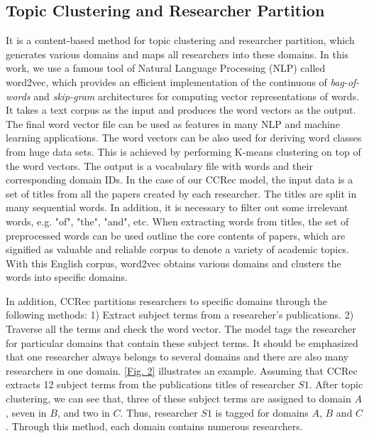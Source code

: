 \documentclass[10pt]{article}
\begin{document}
\subsection*{Topic Clustering and Researcher Partition}
It is a content-based method for topic clustering and researcher partition, which generates various domains and maps all researchers into these domains. In this work, we use a famous tool of Natural Language Processing (NLP) called word2vec, which provides an efficient implementation of the continuous of \emph{bag-of-words} and \emph{skip-gram} architectures for computing vector representations of words. It takes a text corpus as the input and produces the word vectors as the output. The final word vector file can be used as features in many NLP and machine learning applications. The word vectors can be also used for deriving word classes from huge data sets. This is achieved by performing K-means clustering on top of the word vectors. The output is a vocabulary file with words and their corresponding domain IDs. In the case of our CCRec model, the input data is a set of titles from all the papers created by each researcher. The titles are split in many sequential words. In addition, it is necessary to filter out some irrelevant words, e.g. "of", "the", "and", etc. When extracting words from titles, the set of preprocessed words can be used outline the core contents of papers, which are signified as valuable and reliable corpus to denote a variety of academic topics. With this English corpus, word2vec obtains various domains and clusters the words into specific domains.

In addition, CCRec partitions researchers to specific domains through the following methods: 1) Extract subject terms from a researcher's publications. 2) Traverse all the terms and check the word vector. The model tags the researcher for particular domains that contain these subject terms. It should be emphasized that one researcher always belongs to several domains and there are also many researchers in one domain. \autoref{Fig. 2} illustrates an example. Assuming that CCRec extracts 12 subject terms from the publications titles of researcher $S1$. After topic clustering, we can see that, three of these subject terms are assigned to domain $A$, seven in $B$, and two in $C$. Thus, researcher $S1$ is tagged for domains $A$, $B$ and $C$. Through this method, each domain contains numerous researchers.
\end{document}
